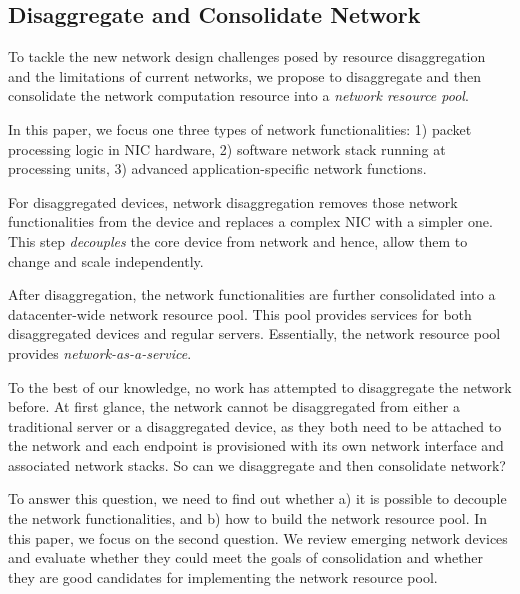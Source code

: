 %

\subsection{Disaggregate and Consolidate Network}

To tackle the new network design challenges posed by resource disaggregation
and the limitations of current networks, we propose to disaggregate
and then consolidate the network computation resource into a \textit{network resource pool}.

In this paper, we focus one three types of network functionalities:
1) packet processing logic in NIC hardware,
2) software network stack running at processing units,
3) advanced application-specific network functions.

For disaggregated devices, network disaggregation removes
those network functionalities from the device and replaces a complex NIC
with a simpler one. This step \textit{decouples}
the core device from network and hence, allow them to change and scale independently.

After disaggregation, the network functionalities are further consolidated
into a datacenter-wide network resource pool. This pool provides services
for both disaggregated devices and regular servers.
Essentially, the network resource pool provides \textit{network-as-a-service}.

To the best of our knowledge, no work has attempted
to disaggregate the network before.
At first glance, the network cannot be disaggregated from
either a traditional server or a disaggregated device,
as they both need to be attached to the network and each
endpoint is provisioned with its own network interface and associated
network stacks. So can we disaggregate and then consolidate network?

To answer this question, we need to find out whether
a) it is possible to decouple the network functionalities,
and b) how to build the network resource pool.
In this paper, we focus on the second question.
We review emerging network devices and evaluate whether they
could meet the goals of consolidation and whether they are good
candidates for implementing the network resource pool.


\fi